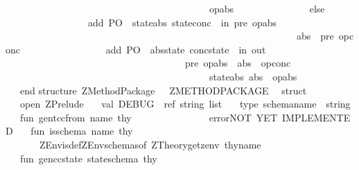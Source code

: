 \begin{isabellebody}
\ \ \ \ \ \ \ \ \ \ \ \ \ \ \ \ \ \ \ \ \ \ \ \ \ \ \ \ \ \ \ \ \ \ \ \ \ \ \ \ \ {\isasymlongrightarrow}\ op{\isacharunderscore}abs\isanewline
\ \ \ \ \ \ \ \ \ \ \ \ \ \ \ else\isanewline
\ \ \ \ \ \ \ \ \ \ \ \ \ \ \ \ \ add\ PO{\isacharcolon}\ {\isasymSforall}\ state{\isacharunderscore}abs\ state{\isacharunderscore}conc{\isachardot}\ {\isasymforall}\ in{\isachardot}\ pre\ op{\isacharunderscore}abs\ \ \isanewline
\ \ \ \ \ \ \ \ \ \ \ \ \ \ \ \ \ \ \ \ \ \ \ \ \ \ \ \ \ \ \ \ \ \ \ \ \ \ \ \ \ \ \ \ \ \ \ \ \ \ \ \ \ \ \ \ \ \ \ {\isacharampersand}\ abs\ {\isasymlongrightarrow}\ pre\ op{\isacharunderscore}conc\isanewline
\ \ \ \ \ \ \ \ \ \ \ \ \ \ \ \ \ add\ PO{\isacharcolon}\ {\isasymSforall}\ abs{\isacharunderscore}state\ conc{\isacharunderscore}state{\isachardot}\ {\isasymforall}\ in\ out{\isachardot}\ \isanewline
\ \ \ \ \ \ \ \ \ \ \ \ \ \ \ \ \ \ \ \ \ \ \ \ \ \ \ \ \ \ \ \ \ \ \ \ \ pre\ op{\isacharunderscore}abs\ {\isasymand}\ abs\ {\isasymand}\ op{\isacharunderscore}conc\ \ {\isasymlongrightarrow}\ \isanewline
\ \ \ \ \ \ \ \ \ \ \ \ \ \ \ \ \ \ \ \ \ \ \ \ \ \ \ \ \ \ \ \ \ \ \ \ \ \ \ \ \ {\isasymSexists}\ state{\isacharunderscore}abs{\isacharprime}{\isachardot}\ abs{\isacharprime}\ {\isasymand}\ op{\isacharunderscore}abs\isanewline
\ \ \ \ \ \ \ \ {\isacharasterisk}{\isacharparenright}\isanewline
\isanewline
\ \ \ end\isanewline
\isanewline
{\isacharverbatimclose}\isanewline
\isanewline
{}\isamarkupfalse%
{\isacharverbatimopen}\isanewline
\isanewline
structure\ ZMethod{\isacharunderscore}Package\ \ {\isacharcolon}\ ZMETHOD{\isacharunderscore}PACKAGE\ \ {\isacharequal}\isanewline
struct\ \isanewline
\ \ \ open\ ZPrelude{\isacharsemicolon}\isanewline
\isanewline
\ \ \ val\ DEBUG\ {\isacharequal}\ ref{\isacharparenleft}{\isacharbrackleft}{\isacharbrackright}{\isacharcolon}\ string\ list{\isacharparenright}\isanewline
\isanewline
\ \ \ type\ schema{\isacharunderscore}name\ {\isacharequal}\ string\isanewline
\isanewline
\ \ \ fun\ gen{\isacharunderscore}tcc{\isacharunderscore}from\ name\ thy\ \ \ \ \ \ \ \ \ \ \ \ \ \ \ {\isacharequal}\ error{\isacharparenleft}{\isachardoublequote}NOT\ YET\ IMPLEMENTED{\isachardoublequote}{\isacharparenright}\isanewline
\isanewline
\ \ \ fun\ is{\isacharunderscore}schema\ name\ thy\ {\isacharequal}\isanewline
\ \ \ \ \ \ \ ZEnv{\isachardot}is{\isacharunderscore}def{\isacharparenleft}ZEnv{\isachardot}schemas{\isacharunderscore}of\ {\isacharparenleft}ZTheory{\isachardot}get{\isacharunderscore}zenv\ thy{\isacharparenright}{\isacharcomma}name{\isacharparenright}\isanewline
\isanewline
\isanewline
\ \ \ fun\ gen{\isacharunderscore}cc{\isacharunderscore}state\ stateschema\ thy\ \ \ \ \ \ \ \ \ {\isacharequal}\ \isanewline

\end{isabellebody}
